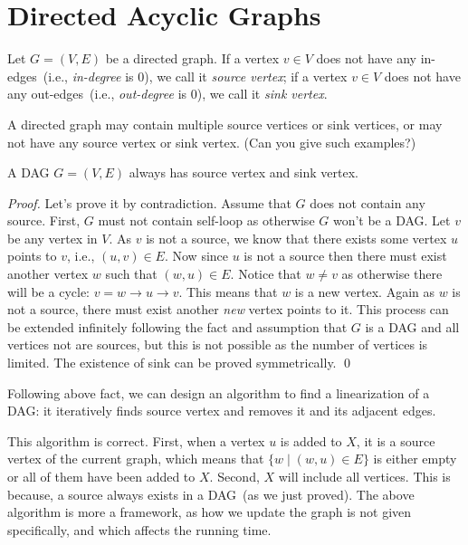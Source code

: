 \section*{Directed Acyclic Graphs}

Let $G = (V, E)$ be a directed graph. 
If a vertex $v\in V$ does not have any in-edges~(i.e., \emph{in-degree} is 0), we call it \emph{source vertex};
if a vertex $v\in V$ does not have any out-edges~(i.e., \emph{out-degree} is 0), we call it \emph{sink vertex}.

A directed graph may contain multiple source vertices or sink vertices,
or may not have any source vertex or sink vertex. (Can you give such examples?)

\begin{claim}
A DAG $G=(V,E)$ always has source vertex and sink vertex.
\end{claim}
\emph{Proof.} Let's prove it by contradiction. Assume that $G$ does not contain any source.
First, $G$ must not contain self-loop as otherwise $G$ won't be a DAG.
Let $v$ be any vertex in $V$. As $v$ is not a source, we know that there exists some vertex $u$ points to $v$, i.e., $(u,v)\in E$.
Now since $u$ is not a source then there must exist another vertex $w$ such that $(w,u)\in E$.
Notice that $w \neq v$ as otherwise there will be a cycle: $v = w \to u \to v$.
This means that $w$ is a new vertex. Again as $w$ is not a source, there must exist another \emph{new} vertex points to it.
This process can be extended infinitely following the fact and assumption that $G$ is a DAG and all vertices not are sources,
but this is not possible as the number of vertices is limited. 
The existence of sink can be proved symmetrically. \qed


Following above fact, we can design an algorithm to find a linearization of a DAG: it iteratively
finds source vertex and removes it and its adjacent edges.

\begin{minipage}{0.8\textwidth}
	\xxx
	\xxx
	\xxx
	\xxx
	\xxx
	\xxx
	\xxx
	\xxx
\end{minipage}

This algorithm is correct. First, when a vertex $u$ is added to $X$,
it is a source vertex of the current graph, which means that
$\{w\mid (w, u)\in E\}$ is either empty or all of them
have been added to $X$. Second, $X$ will include all vertices.
This is because, a source always exists in a DAG~(as we just proved).
The above algorithm is more a framework, as how we update the graph
is not given specifically, and which affects the running time.

